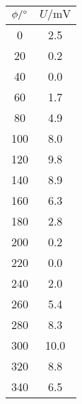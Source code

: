 \begin{tabular}{c|c}
  $\phi/\degree$ & $U/\si\mV$ \\
  \hline
  0 & 2.5 \\
  20 & 0.2 \\
  40 & 0.0 \\
  60 & 1.7 \\
  80 & 4.9 \\
  100 & 8.0 \\
  120 & 9.8 \\
  140 & 8.9 \\
  160 & 6.3 \\
  180 & 2.8 \\
  200 & 0.2 \\
  220 & 0.0 \\
  240 & 2.0 \\
  260 & 5.4 \\
  280 & 8.3 \\
  300 & 10.0 \\
  320 & 8.8 \\
  340 & 6.5 \\
\end{tabular}